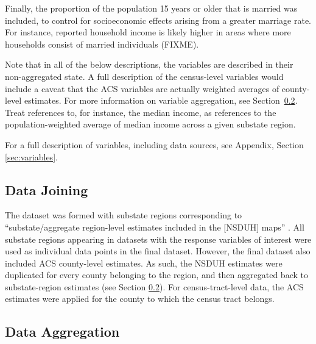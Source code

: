 \documentclass{article}
\begin{document}
Finally, the proportion of the population 15 years or older that is
married was included, to control for socioeconomic effects arising from
a greater marriage rate. For instance, reported household income is
likely higher in areas where more households consist of married
individuals (FIXME).

%
%

Note that in all of the below descriptions, the variables are described in their
non-aggregated state. A full description of the census-level variables would
include a caveat that the ACS variables are actually weighted averages of
county-level estimates. For more information on variable aggregation, see
Section~\ref{sec:aggregation}. Treat references to, for instance, the
median income, as references to the population-weighted average of
median income across a given substate region.


For a full description of variables, including data sources, see
Appendix, Section \ref{sec:variables}.

\subsection{Data Joining}\label{sec:joining}

The dataset was formed with substate regions corresponding to
``substate/aggregate region-level estimates included in the [NSDUH] maps''
\cite{samhsa_data}. All substate regions appearing in datasets with the response
variables of interest were used as individual data points in the final dataset.
However, the final dataset also included ACS county-level estimates. As such,
the NSDUH estimates were duplicated for every county belonging to the region,
and then aggregated back to substate-region estimates (see Section
\ref{sec:aggregation}).
For census-tract-level data, the ACS estimates
were applied for the county to which the census tract belongs.

\subsection{Data Aggregation}\label{sec:aggregation}
\end{document}
